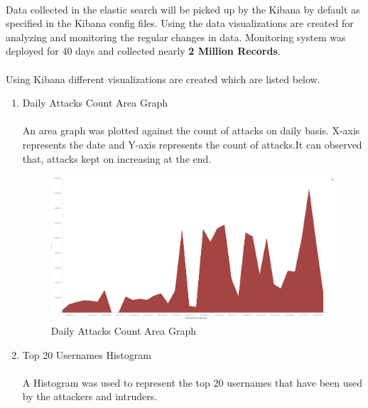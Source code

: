 \documentclass{report}
\begin{document}
\paragraph{}
Data collected in the elastic search will be picked up by the Kibana by default as specified in the Kibana config files. Using the data visualizations are created for analyzing and monitoring the regular changes in data. Monitoring system was deployed for 40 days and collected nearly \textbf{2 Million Records}.

\paragraph{}
Using Kibana different visualizations are created which are listed below.
\begin{enumerate}
\item Daily Attacks Count Area Graph
\paragraph{}
An area graph was plotted against the count of attacks on daily basis. X-axis represents the date and Y-axis represents the count of attacks.It can observed that, attacks kept on increasing at the end.

\begin{figure}[H]
\centering
\caption{Daily Attacks Count Area Graph}
\includegraphics[scale=0.2]{Daily_Attacks_Count}
\end{figure}


\item Top 20 Usernames Histogram
\paragraph{}
A Histogram was used to represent the top 20 usernames that have been used by the attackers and intruders.


\end{enumerate}
\end{document}
